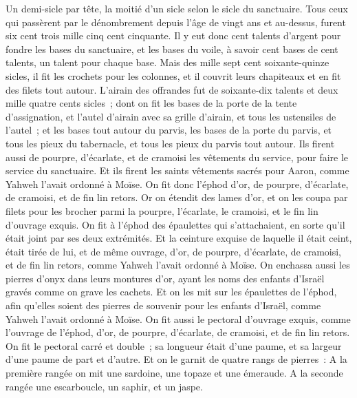 \begin{multicols}{2}
Un demi-sicle par tête, la moitié d'un sicle selon le sicle du sanctuaire. Tous ceux qui passèrent par le dénombrement depuis l'âge de vingt ans et au-dessus, furent six cent trois mille cinq cent cinquante.
Il y eut donc cent talents d'argent pour fondre les bases du sanctuaire, et les bases du voile, à savoir cent bases de cent talents, un talent pour chaque base.
Mais des mille sept cent soixante-quinze sicles, il fit les crochets pour les colonnes, et il couvrit leurs chapiteaux et en fit des filets tout autour.
L'airain des offrandes fut de soixante-dix talents et deux mille quatre cents sicles~;
dont on fit les bases de la porte de la tente d'assignation, et l'autel d'airain avec sa grille d'airain, et tous les ustensiles de l'autel~;
et les bases tout autour du parvis, les bases de la porte du parvis, et tous les pieux du tabernacle, et tous les pieux du parvis tout autour.
\VerseOne{}Ils firent aussi de pourpre, d'écarlate, et de cramoisi les vêtements du service, pour faire le service du sanctuaire. Et ils firent les saints vêtements sacrés pour Aaron, comme Yahweh l'avait ordonné à Moïse.
On fit donc l'éphod d'or, de pourpre, d'écarlate, de cramoisi, et de fin lin retors.
Or on étendit des lames d'or, et on les coupa par filets pour les brocher parmi la pourpre, l'écarlate, le cramoisi, et le fin lin d'ouvrage exquis.
On fit à l'éphod des épaulettes qui s'attachaient, en sorte qu'il était joint par ses deux extrémités.
Et la ceinture exquise de laquelle il était ceint, était tirée de lui, et de même ouvrage, d'or, de pourpre, d'écarlate, de cramoisi, et de fin lin retors, comme Yahweh l'avait ordonné à Moïse.
On enchassa aussi les pierres d'onyx dans leurs montures d'or, ayant les noms des enfants d'Israël gravés comme on grave les cachets.
Et on les mit sur les épaulettes de l'éphod, afin qu'elles soient des pierres de souvenir pour les enfants d'Israël, comme Yahweh l'avait ordonné à Moïse.
On fit aussi le pectoral d'ouvrage exquis, comme l'ouvrage de l'éphod, d'or, de pourpre, d'écarlate, de cramoisi, et de fin lin retors.
On fit le pectoral carré et double~; sa longueur était d'une paume, et sa largeur d'une paume de part et d'autre.
Et on le garnit de quatre rangs de pierres~: A la première rangée on mit une sardoine, une topaze et une émeraude.
A la seconde rangée une escarboucle, un saphir, et un jaspe.

\end{multicols}
